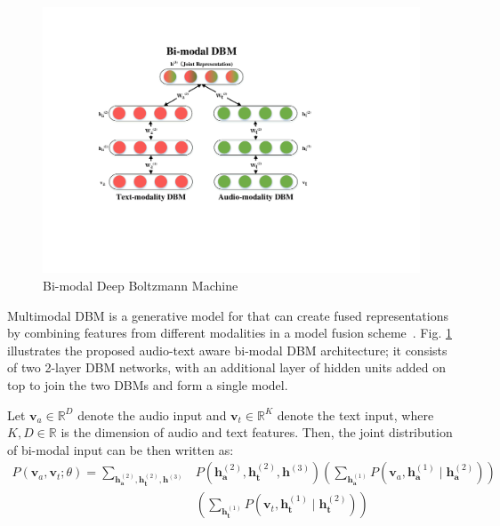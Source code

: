 \documentclass{llncs}
\begin{document}
\begin{figure}
	\centering
	\includegraphics[width=0.5\columnwidth]{figures/bi-modalDBM}
	\caption{Bi-modal Deep Boltzmann Machine}
	\label{fg:DBM}
\end{figure}

Multimodal DBM is a generative model for that can create fused representations by combining features from different modalities in a model fusion scheme~\cite{DBLP:journals/jmlr/SrivastavaS14}. %
Fig. \ref{fg:DBM} illustrates the proposed audio-text aware bi-modal DBM architecture; it consists of two 2-layer DBM networks, with an additional layer of hidden units added on top to join the two DBMs and form a single model. 

Let $\mathbf{v}_{a}\in\mathbb{R}^{D}$ denote the audio input and $\mathbf{v}_{t}\in\mathbb{R}^{K}$ denote the text input, where $K,D\in\mathbb{R}$ is the dimension of audio and text features. Then, the joint distribution of bi-modal input can be then written as:
\begin{equation}\label{eq3}
\begin{split}
P(\mathbf{v}_{a},\mathbf{v}_{t};\theta)=\sum_{\mathbf{h}_{\mathbf{a}}^{(2)},\mathbf{h}_{\mathbf{t}}^{(2)},\mathbf{h}^{(3)}} &P(\mathbf{h}_{\mathbf{a}}^{(2)},\mathbf{h}_{\mathbf{t}}^{(2)},\mathbf{h}^{(3)})\left(\sum_{\mathbf{h}_{\mathbf{a}}^{(1)}}P(\mathbf{v}_{a},\mathbf{h}_{\mathbf{a}}^{(1)}\mid \mathbf{h}_{\mathbf{a}}^{(2)})\right) \\
& \left(\sum_{\mathbf{h}_{\mathbf{t}}^{(1)}}P(\mathbf{v}_{t},\mathbf{h}_{\mathbf{t}}^{(1)}\mid \mathbf{h}_{\mathbf{t}}^{(2)})\right)
\end{split}
\end{equation}
\end{document}

